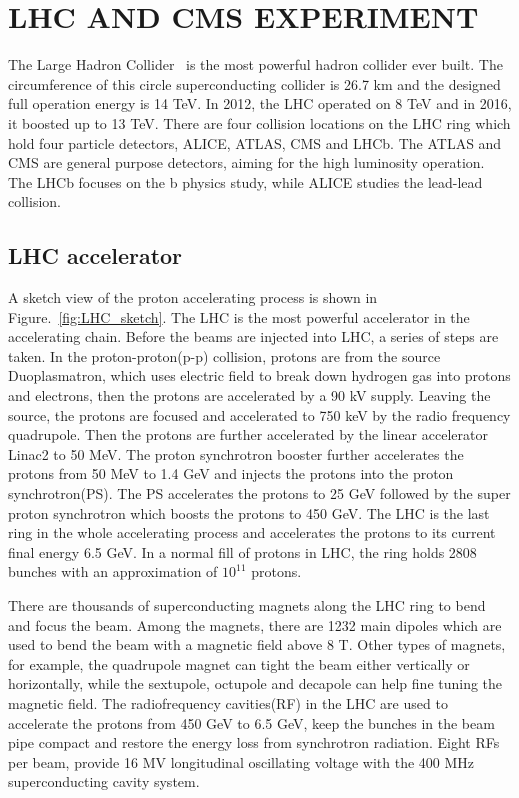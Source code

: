\chapter{LHC AND CMS EXPERIMENT}

The Large Hadron Collider~\cite{LHC_refer} is the most powerful hadron collider ever built. The circumference of this circle superconducting collider is 26.7 km and the designed full operation energy is 14 TeV. In 2012, the LHC operated on 8 TeV and in 2016, it boosted up to 13 TeV. There are four collision locations on the LHC ring which hold four particle detectors, ALICE, ATLAS, CMS and LHCb. The ATLAS and CMS are general purpose detectors, aiming for the high luminosity operation. The LHCb focuses on the b physics study, while ALICE studies the lead-lead collision.
\section{LHC accelerator}

A sketch view of the proton accelerating process is shown in Figure.~\ref{fig:LHC_sketch}. The LHC is the most powerful accelerator in the accelerating chain. Before the beams are injected into LHC, a series of steps are taken. In the proton-proton(p-p) collision, protons are from the source Duoplasmatron, which uses electric field to break down hydrogen gas into protons and electrons, then the protons are accelerated by a 90 kV supply. Leaving the source, the protons are focused and accelerated to 750 keV by the radio frequency quadrupole. Then the protons are further accelerated by the linear accelerator Linac2 to 50 MeV. The proton synchrotron booster further accelerates the protons from 50 MeV to 1.4 GeV and injects the protons into the proton synchrotron(PS). The PS accelerates the protons to 25 GeV followed by the super proton synchrotron which boosts the protons to 450 GeV. The LHC is the last ring in the whole accelerating process and accelerates the protons to its current final energy 6.5 GeV. In a normal fill of protons in LHC, the ring holds 2808 bunches with an approximation of $10^{11}$ protons.

There are thousands of superconducting magnets along the LHC ring to bend and focus the beam. Among the magnets, there are 1232 main dipoles which are used to bend the beam with a magnetic field above 8 T. Other types of magnets, for example, the quadrupole magnet can tight the beam either vertically or horizontally, while the sextupole, octupole and decapole can help fine tuning the magnetic field. The radiofrequency cavities(RF) in the LHC are used to accelerate the protons from 450 GeV to 6.5 GeV, keep the bunches in the beam pipe compact and restore the energy loss from synchrotron radiation. Eight RFs per beam, provide 16 MV  longitudinal oscillating voltage with the 400 MHz superconducting cavity system. 

